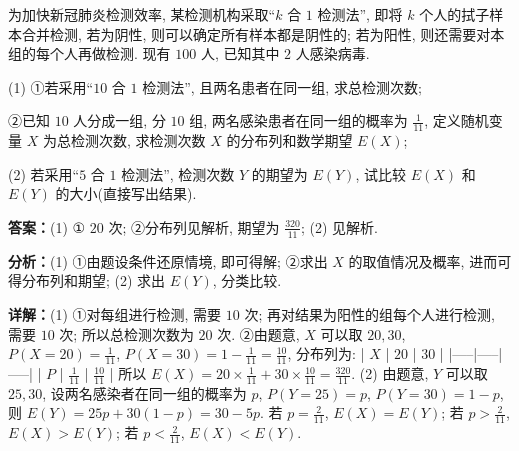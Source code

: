 \begin{question}[points=14]
为加快新冠肺炎检测效率, 某检测机构采取“$k$ 合 $1$ 检测法”, 即将 $k$ 个人的拭子样本合并检测, 若为阴性, 则可以确定所有样本都是阴性的; 若为阳性, 则还需要对本组的每个人再做检测. 现有 $100$ 人, 已知其中 $2$ 人感染病毒.

(1) ①若采用“$10$ 合 $1$ 检测法”, 且两名患者在同一组, 求总检测次数;

②已知 $10$ 人分成一组, 分 $10$ 组, 两名感染患者在同一组的概率为 $\frac{1}{11}$, 定义随机变量 $X$ 为总检测次数, 求检测次数 $X$ 的分布列和数学期望 $E(X)$;

(2) 若采用“$5$ 合 $1$ 检测法”, 检测次数 $Y$ 的期望为 $E(Y)$, 试比较 $E(X)$ 和 $E(Y)$ 的大小(直接写出结果).
\begin{solution}
\textbf{答案：}(1) ① $20$ 次; ②分布列见解析, 期望为 $\frac{320}{11}$; (2) 见解析.

\textbf{分析：}(1) ①由题设条件还原情境, 即可得解; ②求出 $X$ 的取值情况及概率, 进而可得分布列和期望; (2) 求出 $E(Y)$, 分类比较.

\textbf{详解：}(1) ①对每组进行检测, 需要 $10$ 次; 再对结果为阳性的组每个人进行检测, 需要 $10$ 次; 所以总检测次数为 $20$ 次.
②由题意, $X$ 可以取 $20,30$, $P(X=20)=\frac{1}{11}$, $P(X=30)=1-\frac{1}{11}=\frac{10}{11}$, 分布列为:
| $X$ | $20$ | $30$ |
|-----|-----|-----|
| $P$ | $\frac{1}{11}$ | $\frac{10}{11}$ |
所以 $E(X)=20\times\frac{1}{11}+30\times\frac{10}{11}=\frac{320}{11}$.
(2) 由题意, $Y$ 可以取 $25,30$, 设两名感染者在同一组的概率为 $p$, $P(Y=25)=p$, $P(Y=30)=1-p$, 则 $E(Y)=25p+30(1-p)=30-5p$. 若 $p=\frac{2}{11}$, $E(X)=E(Y)$; 若 $p>\frac{2}{11}$, $E(X)>E(Y)$; 若 $p<\frac{2}{11}$, $E(X)<E(Y)$.
\end{solution}
\end{question}

